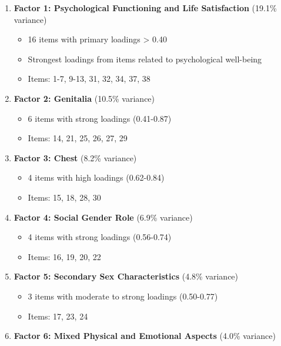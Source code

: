 \documentclass[man,floatsintext,12pt]{apa7}
\begin{document}
\begin{enumerate}
\def\labelenumi{\arabic{enumi}.}
\tightlist
\item
  \textbf{Factor 1: Psychological Functioning and Life Satisfaction}
  (19.1\% variance)

  \begin{itemize}
  \tightlist
  \item
    16 items with primary loadings \textgreater{} 0.40
  \item
    Strongest loadings from items related to psychological well-being
  \item
    Items: 1-7, 9-13, 31, 32, 34, 37, 38
  \end{itemize}
\item
  \textbf{Factor 2: Genitalia} (10.5\% variance)

  \begin{itemize}
  \tightlist
  \item
    6 items with strong loadings (0.41-0.87)
  \item
    Items: 14, 21, 25, 26, 27, 29
  \end{itemize}
\item
  \textbf{Factor 3: Chest} (8.2\% variance)

  \begin{itemize}
  \tightlist
  \item
    4 items with high loadings (0.62-0.84)
  \item
    Items: 15, 18, 28, 30
  \end{itemize}
\item
  \textbf{Factor 4: Social Gender Role} (6.9\% variance)

  \begin{itemize}
  \tightlist
  \item
    4 items with strong loadings (0.56-0.74)
  \item
    Items: 16, 19, 20, 22
  \end{itemize}
\item
  \textbf{Factor 5: Secondary Sex Characteristics} (4.8\% variance)

  \begin{itemize}
  \tightlist
  \item
    3 items with moderate to strong loadings (0.50-0.77)
  \item
    Items: 17, 23, 24
  \end{itemize}
\item
  \textbf{Factor 6: Mixed Physical and Emotional Aspects} (4.0\%
  variance)


\end{enumerate}
\end{document}
